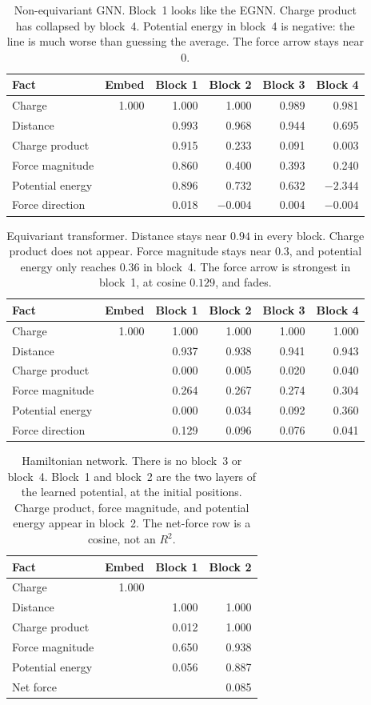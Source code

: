 \documentclass[11pt]{article}
\newcommand{\probehdr}{%
  \toprule
  Fact & Embed & Block 1 & Block 2 & Block 3 & Block 4 \\
  \midrule
}
\begin{document}
\begin{table}[ht]
\centering
\caption{Non-equivariant GNN.
Block~1 looks like the EGNN.
Charge product has collapsed by block~4.
Potential energy in block~4 is negative: the line is much worse than guessing the average.
The force arrow stays near $0$.}
\label{tab:noneq}
\begin{tabular}{lrrrrr}
\probehdr
Charge & 1.000 & 1.000 & 1.000 & 0.989 & 0.981 \\
Distance & & 0.993 & 0.968 & 0.944 & 0.695 \\
Charge product & & 0.915 & 0.233 & 0.091 & 0.003 \\
Force magnitude & & 0.860 & 0.400 & 0.393 & 0.240 \\
Potential energy & & 0.896 & 0.732 & 0.632 & $-2.344$ \\
Force direction & & 0.018 & $-0.004$ & 0.004 & $-0.004$ \\
\bottomrule
\end{tabular}
\end{table}

\begin{table}[ht]
\centering
\caption{Equivariant transformer.
Distance stays near $0.94$ in every block.
Charge product does not appear.
Force magnitude stays near $0.3$, and potential energy only reaches $0.36$ in block~4.
The force arrow is strongest in block~1, at cosine $0.129$, and fades.}
\label{tab:eqt}
\begin{tabular}{lrrrrr}
\probehdr
Charge & 1.000 & 1.000 & 1.000 & 1.000 & 1.000 \\
Distance & & 0.937 & 0.938 & 0.941 & 0.943 \\
Charge product & & 0.000 & 0.005 & 0.020 & 0.040 \\
Force magnitude & & 0.264 & 0.267 & 0.274 & 0.304 \\
Potential energy & & 0.000 & 0.034 & 0.092 & 0.360 \\
Force direction & & 0.129 & 0.096 & 0.076 & 0.041 \\
\bottomrule
\end{tabular}
\end{table}

\begin{table}[ht]
\centering
\caption{Hamiltonian network.
There is no block~3 or block~4.
Block~1 and block~2 are the two layers of the learned potential, at the initial positions.
Charge product, force magnitude, and potential energy appear in block~2.
The net-force row is a cosine, not an $R^2$.}
\label{tab:hnn}
\begin{tabular}{lrrr}
\toprule
Fact & Embed & Block 1 & Block 2 \\
\midrule
Charge & 1.000 & & \\
Distance & & 1.000 & 1.000 \\
Charge product & & 0.012 & 1.000 \\
Force magnitude & & 0.650 & 0.938 \\
Potential energy & & 0.056 & 0.887 \\
Net force & & & 0.085 \\
\bottomrule
\end{tabular}
\end{table}
\end{document}

